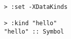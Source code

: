 \begin{repl}\begin{lstlisting}
> :set -XDataKinds

> :kind "hello"
"hello" :: Symbol\end{lstlisting}\end{repl}
